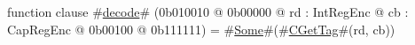 function clause #\hyperref[sailMIPSzdecode]{decode}# (0b010010 @ 0b00000 @ rd : IntRegEnc @ cb : CapRegEnc @    0b00100 @ 0b111111) = #\hyperref[sailMIPSzSome]{Some}#(#\hyperref[sailMIPSzCGetTag]{CGetTag}#(rd, cb))
